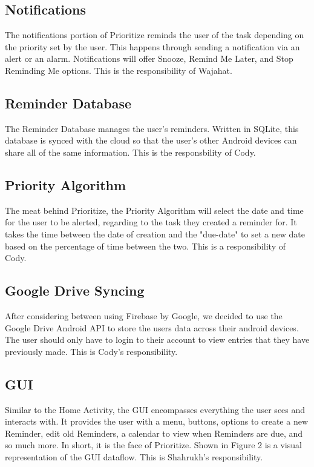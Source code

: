\documentclass[12pt]{article}
\begin{document}
\subsection{Notifications}
The notifications portion of Prioritize reminds the user of the task depending on the priority set by the user. This happens through sending a notification via an alert or an alarm.  Notifications will offer Snooze, Remind Me Later, and Stop Reminding Me options. This is the responsibility of Wajahat.

\subsection{Reminder Database}
The Reminder Database manages the user's reminders. Written in SQLite, this database is synced with the cloud so that the user's other Android devices can share all of the same information. This is the responsbility of Cody.


\subsection{Priority Algorithm}
The meat behind Prioritize, the Priority Algorithm will select the date and time for the user to be alerted, regarding to the task they created a reminder for. It takes the time between the date of creation and the "due-date" to set a new date based on the percentage of time between the two. This is a responsibility of Cody.

\subsection{Google Drive Syncing}
After considering between using Firebase by Google, we decided to use the Google Drive Android API to store the users data across their android devices. The user should only have to login to their account to view entries that they have previously made. This is Cody's responsibility.

\subsection{GUI}
Similar to the Home Activity, the GUI encompasses everything the user sees and interacts with. It provides the user with a menu, buttons, options to create a new Reminder, edit old Reminders, a calendar to view when Reminders are due, and so much more. In short, it is the face of Prioritize. Shown in Figure 2 is a visual representation of the GUI dataflow. This is Shahrukh's responsibility.
\end{document}

